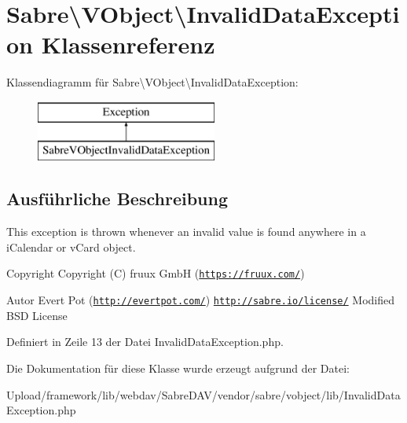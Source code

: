 \hypertarget{class_sabre_1_1_v_object_1_1_invalid_data_exception}{}\section{Sabre\textbackslash{}V\+Object\textbackslash{}Invalid\+Data\+Exception Klassenreferenz}
\label{class_sabre_1_1_v_object_1_1_invalid_data_exception}
Klassendiagramm für Sabre\textbackslash{}V\+Object\textbackslash{}Invalid\+Data\+Exception\+:\begin{figure}[H]
\begin{center}
\leavevmode
\includegraphics[height=2.000000cm]{class_sabre_1_1_v_object_1_1_invalid_data_exception}
\end{center}
\end{figure}


\subsection{Ausführliche Beschreibung}
This exception is thrown whenever an invalid value is found anywhere in a i\+Calendar or v\+Card object.

\begin{DoxyCopyright}{Copyright}
Copyright (C) fruux GmbH (\href{https://fruux.com/}{\tt https\+://fruux.\+com/}) 
\end{DoxyCopyright}
\begin{DoxyAuthor}{Autor}
Evert Pot (\href{http://evertpot.com/}{\tt http\+://evertpot.\+com/})  \href{http://sabre.io/license/}{\tt http\+://sabre.\+io/license/} Modified B\+SD License 
\end{DoxyAuthor}


Definiert in Zeile 13 der Datei Invalid\+Data\+Exception.\+php.



Die Dokumentation für diese Klasse wurde erzeugt aufgrund der Datei\+:\begin{DoxyCompactItemize}
\item 
Upload/framework/lib/webdav/\+Sabre\+D\+A\+V/vendor/sabre/vobject/lib/Invalid\+Data\+Exception.\+php\end{DoxyCompactItemize}
